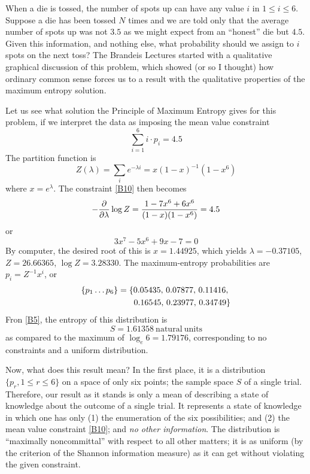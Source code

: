 When a die is tossed, the number of spots up can have any value $i$ in $1\leq i\leq 6$.
Suppose a die has been tossed $N$ times and we are told only that the average number of spots up was not $3.5$ as we might expect from an ``honest'' die but $4.5$.
Given this information, and nothing else, what probability should we assign to $i$ spots on the next toss?
The Brandeis Lectures started with a qualitative graphical discussion of this problem, which showed (or so I thought) how ordinary common sense forces us to a result with the qualitative properties of the maximum entropy solution.

Let us see what solution the Principle of Maximum Entropy gives for this problem, if we interpret the data as imposing the mean value constraint
\begin{equation}
	\label{B10}
	\sum_{i=1}^{6} i\cdot p_i = 4.5
\end{equation}
The partition function is
\begin{equation}
	\label{B11}
	Z(\lambda) = \sum_{i} e^{-\lambda i} = x(1-x)^{-1} (1-x^6)
\end{equation}
where $x = e^\lambda$.
The constraint \eqref{B10} then becomes
\begin{equation*}
	-\pdv{}{\lambda} \log Z = \frac{1 - 7x^6 + 6x^6}{(1-x)(1-x^6)} = 4.5
\end{equation*}
or
\begin{equation}
	\label{B12}
	3x^7 - 5x^6 + 9x - 7 = 0
\end{equation}
By computer, the desired root of this is $x = 1.44925$, which yields $\lambda = -0.37105$, $Z = 26.66365$, $\log Z = 3.28330$.
The maximum-entropy probabilities are $p_i = Z^{-1}x^i$, or
\begin{equation}
	\label{B13}
	\begin{split}
		\{p_1\ldots p_6\}
		&= \{0.05435,\, 0.07877,\, 0.11416,\,\\
		&\hphantom{= \{\ } 0.16545,\, 0.23977,\, 0.34749\}
	\end{split}
\end{equation}
Fron \eqref{B5}, the entropy of this distribution is
\begin{equation}
	\label{B14}
	S = 1.61358\ \mathrm{natural\ units}
\end{equation}
as compared to the maximum of $\log_e 6 = 1.79176$, corresponding to no constraints and a uniform distribution.

Now, what does this result mean?
In the first place, it is a distribution $\{p_r, 1 \leq r \leq 6\}$ on a space of only six points; the sample space $S$ of a single trial.
Therefore, our result as it stands is only a mean of describing a state of knowledge about the outcome of a single trial.
It represents a state of knowledge in which one has only (1) the enumeration of the six possibilities; and (2) the mean value constraint \eqref{B10}; and \emph{no other information}.
The distribution is ``maximally noncommittal'' with respect to all other matters; it is as uniform (by the criterion of the Shannon information measure) as it can get without violating the given constraint.

